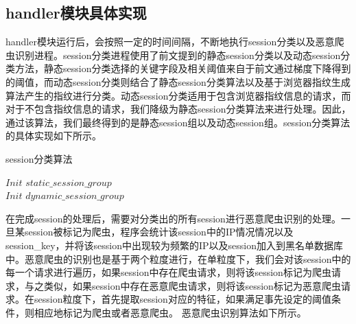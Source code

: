 \documentclass[doctor,privacy,twoside]{buaa_mac}
\begin{document}
\subsection{handler模块具体实现}
handler模块运行后，会按照一定的时间间隔，不断地执行session分类以及恶意爬虫识别进程。session分类进程使用了前文提到的静态session分类以及动态session分类方法，静态session分类选择的关键字段及相关阈值来自于前文通过梯度下降得到的阈值，而动态session分类则结合了静态session分类算法以及基于浏览器指纹生成算法产生的指纹进行分类。动态session分类适用于包含浏览器指纹信息的请求，而对于不包含指纹信息的请求，我们降级为静态session分类算法来进行处理。因此，通过该算法，我们最终得到的是静态session组以及动态session组。session分类算法的具体实现如下所示。

\begin{algorithm}[!h]
  \caption{session分类算法}
  

$Init$  $static\_{}session\_{}group$\\
$Init$  $dynamic\_{}session\_{}group$\\

 
\end{algorithm}

在完成session的处理后，需要对分类出的所有session进行恶意爬虫识别的处理。一旦某session被标记为爬虫，程序会统计该session中的IP情况情况以及session\_{}key，并将该session中出现较为频繁的IP以及session加入到黑名单数据库中。恶意爬虫的识别也是基于两个粒度进行，在单粒度下，我们会对该session中的每一个请求进行遍历，如果session中存在爬虫请求，则将该session标记为爬虫请求，与之类似，如果session中存在恶意爬虫请求，则将该session标记为恶意爬虫请求。在session粒度下，首先提取session对应的特征，如果满足事先设定的阈值条件，则相应地标记为爬虫或者恶意爬虫。 恶意爬虫识别算法如下所示。
\end{document}
